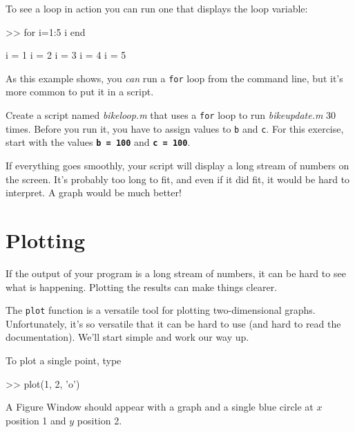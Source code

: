 
To see a loop in action you can run one that displays the
loop variable:

\begin{code}
>> for i=1:5
    i
end

i = 1
i = 2
i = 3
i = 4
i = 5
\end{code}

As this example shows, you \emph{can} run a \lstinline{for} loop from the
command line, but it's more common to put it in a script.

\begin{ex}
Create a script named \emph{bike\textunderscore loop.m} that uses a \lstinline{for} loop to run \emph{bike\textunderscore update.m} 30 times.  Before you run it, you have to assign values to \lstinline{b} and \lstinline{c}.
For this exercise, start with the values \textbf{\lstinline{b = 100}} and \textbf{\lstinline{c = 100}}.

If everything goes smoothly, your script will display a long stream
of numbers on the screen.  It's probably too long
to fit, and even if it did fit, it would be hard to interpret.
A graph would be much better!
\end{ex}



\section{Plotting}
\label{plotting}


If the output of your program is a long stream of numbers, it can be hard to see what is happening.
Plotting the results can make things clearer.

The \lstinline{plot} function is a versatile tool for plotting two-dimensional graphs.  Unfortunately, it's so versatile that it can be hard to use (and hard to read the documentation).
We'll start simple and work our way up.

To plot a single point, type

\begin{code}
>> plot(1, 2, 'o')
\end{code}

A Figure Window should appear with a graph and a single blue circle at $x$ position 1 and $y$ position 2.


